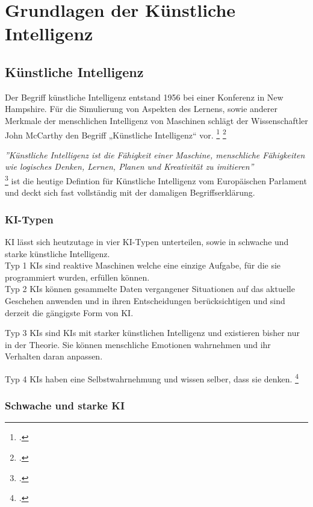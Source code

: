 \chapter{Grundlagen der Künstliche Intelligenz\label{cha:chapter2}}

\section{Künstliche Intelligenz\label{sec:bb}}

Der Begriff künstliche Intelligenz entstand 1956 bei einer 
Konferenz in New Hampshire. Für die Simulierung von Aspekten des 
Lernens, sowie anderer Merkmale der menschlichen Intelligenz von 
Maschinen schlägt der Wissenschaftler John McCarthy den Begriff 
„Künstliche Intelligenz“ vor. 
\footcite{WasIstKuenstliche2021} \footcite{WhatAIBasic}

\textit{''Künstliche Intelligenz ist die Fähigkeit einer Maschine, 
menschliche Fähigkeiten wie logisches Denken, Lernen, Planen und 
Kreativität zu imitieren''} \\ \footcite{WasIstKuenstliche2020}
ist die heutige Defintion für Künstliche Intelligenz vom Europäischen Parlament 
und deckt sich fast vollständig mit der damaligen Begriffserklärung.

\subsection{KI-Typen}
KI lässt sich heutzutage in vier KI-Typen unterteilen, 
sowie in schwache und starke künstliche Intelligenz.
\\

Typ 1 KIs sind reaktive 
Maschinen welche eine einzige Aufgabe, für die sie programmiert wurden, 
erfüllen können.
\\

Typ 2 KIs können gesammelte Daten vergangener 
Situationen auf das aktuelle Geschehen anwenden und 
in ihren Entscheidungen berücksichtigen und sind derzeit die gängigste Form von KI.

Typ 3 KIs sind KIs mit starker künstlichen Intelligenz und 
existieren bisher nur in der Theorie. 
Sie können menschliche Emotionen wahrnehmen und ihr Verhalten daran anpassen.

Typ 4 KIs haben eine Selbstwahrnehmung und wissen selber, dass sie denken. 
\footcite{stadlerKuenstlicheIntelligenz}

\subsection{Schwache und starke KI}

